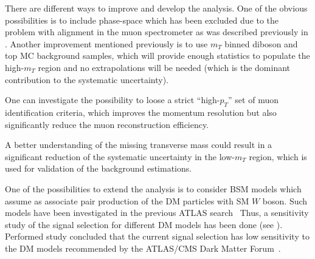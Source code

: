 There are different ways to improve and develop the analysis.
One of the obvious possibilities is to include phase-space which has been excluded due
to the problem with alignment in the muon spectrometer as was described previously in .
Another improvement mentioned previously is to use $m_T$ binned diboson and top MC background samples, which will provide enough statistics to populate the high-$m_T$ region and no extrapolations will be needed (which is the dominant contribution to the systematic uncertainty).

One can investigate the possibility to loose a strict ``high-$p_T$'' set of muon identification criteria, which improves the momentum resolution but also significantly reduce the muon reconstruction efficiency.


A better understanding of the missing transverse mass could result in a significant reduction of the systematic uncertainty in the low-$m_T$ region, which is used for validation of the background estimations.

One of the possibilities to extend the analysis is to consider BSM models which assume as associate pair production of the DM particles with SM $W$ boson.
Such models have been investigated in the previous ATLAS search~\cite{wprime_8TeV}
Thus, a sensitivity study of the signal selection for different DM models has been done (see ).
Performed study concluded that the current signal selection has low sensitivity to the DM models recommended by the ATLAS/CMS Dark Matter Forum~\cite{DM_forum_2015}.



